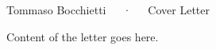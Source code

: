 \documentclass[11pt, a4paper]{awesome-cv}
\begin{document}
\makecvheader[C]

\makecvfooter
{}
{Tommaso Bocchietti~~~·~~~Cover Letter}
{}

\makelettertitle

\begin{cvletter}

    Content of the letter goes here.

\end{cvletter}

\makeletterclosing
\end{document}
